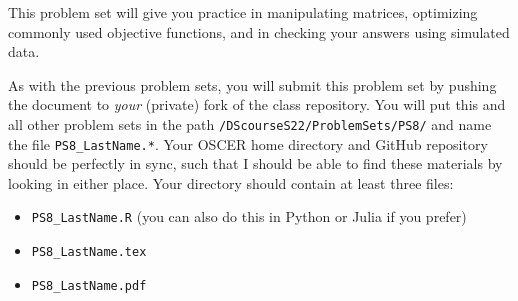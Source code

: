\documentclass[12pt,english]{exam}
\begin{document}
This problem set will give you practice in manipulating matrices, optimizing commonly used objective functions, and in checking your answers using simulated data.

As with the previous problem sets, you will submit this problem set by pushing the document to \emph{your} (private) fork of the class repository. You will put this and all other problem sets in the path \texttt{/DScourseS22/ProblemSets/PS8/} and name the file \texttt{PS8\_LastName.*}. Your OSCER home directory and GitHub repository should be perfectly in sync, such that I should be able to find these materials by looking in either place. Your directory should contain at least three files:
\begin{itemize}
    \item \texttt{PS8\_LastName.R} (you can also do this in Python or Julia if you prefer)
    \item \texttt{PS8\_LastName.tex}
    \item \texttt{PS8\_LastName.pdf}
\end{itemize}
\end{document}
